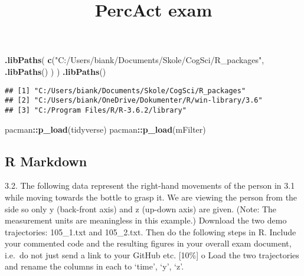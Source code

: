 \documentclass[
]{article}
\title{PercAct exam}
\author{}
\date{\vspace{-2.5em}}
\newenvironment{Shaded}{\begin{snugshade}}{\end{snugshade}}
\newcommand{\KeywordTok}[1]{\textcolor[rgb]{0.13,0.29,0.53}{\textbf{#1}}}
\newcommand{\NormalTok}[1]{#1}
\newcommand{\OperatorTok}[1]{\textcolor[rgb]{0.81,0.36,0.00}{\textbf{#1}}}
\newcommand{\StringTok}[1]{\textcolor[rgb]{0.31,0.60,0.02}{#1}}
\begin{document}
\maketitle

\begin{Shaded}
\begin{Highlighting}[]
\KeywordTok{.libPaths}\NormalTok{( }\KeywordTok{c}\NormalTok{(}\StringTok{"C:/Users/biank/Documents/Skole/CogSci/R_packages"}\NormalTok{, }\KeywordTok{.libPaths}\NormalTok{() ) )}
\KeywordTok{.libPaths}\NormalTok{()}
\end{Highlighting}
\end{Shaded}

\begin{verbatim}
## [1] "C:/Users/biank/Documents/Skole/CogSci/R_packages"    
## [2] "C:/Users/biank/OneDrive/Dokumenter/R/win-library/3.6"
## [3] "C:/Program Files/R/R-3.6.2/library"
\end{verbatim}

\begin{Shaded}
\begin{Highlighting}[]
\NormalTok{pacman}\OperatorTok{::}\KeywordTok{p_load}\NormalTok{(tidyverse)}
\NormalTok{pacman}\OperatorTok{::}\KeywordTok{p_load}\NormalTok{(mFilter)}
\end{Highlighting}
\end{Shaded}

\hypertarget{r-markdown}{%
\subsection{R Markdown}\label{r-markdown}}

3.2. The following data represent the right-hand movements of the person
in 3.1 while moving towards the bottle to grasp it. We are viewing the
person from the side so only y (back-front axis) and z (up-down axis)
are given. (Note: The measurement units are meaningless in this
example.) Download the two demo trajectories: 105\_1.txt and 105\_2.txt.
Then do the following steps in R. Include your commented code and the
resulting figures in your overall exam document, i.e.~do not just send a
link to your GitHub etc. {[}10\%{]} o Load the two trajectories and
rename the columns in each to `time', `y', `z'.
\end{document}

